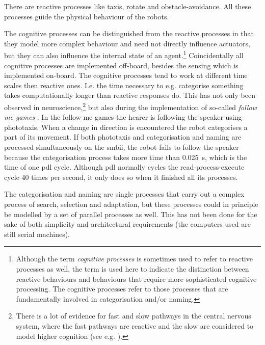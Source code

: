 There are reactive processes like taxis, rotate and obstacle-avoidance. All these processes guide the physical behaviour of the robots.


The cognitive processes can be distinguished from the reactive processes in that they model more complex behaviour and need not directly influence actuators, but they can also influence the internal state of an agent.\footnote{Although the term {\em cognitive processes} is sometimes used to refer to reactive processes as well, the term is used here to indicate the distinction between reactive behaviours and behaviours that require more sophisticated cognitive processing. The cognitive processes refer to those processes that are fundamentally involved in categorisation and/or naming.} Coincidentally all cognitive processes are implemented off-board, besides the sensing which is implemented on-board. The cognitive processes tend to work at different time scales then reactive ones. I.e. the time necessary to e.g. categorise something takes computationally longer than reactive responses do. This has not only been observed in neuroscience,\footnote{There is a lot of evidence for fast and slow pathways in the central nervous system, where the fast pathways are reactive and the slow are considered to model higher cognition (see e.g. \citealt{ledoux:1996}).} but also during the implementation of so-called {\it follow me games} \citep{vogt:1999a,vogt:2000}.  In the follow me games the hearer is following the speaker using phototaxis. When a change in direction is encountered the robot categorises a part of its movement. If both phototaxis and categorisation and naming are processed simultaneously on the {\sc smbii}, the robot fails to follow the speaker because the categorisation process takes more time than 0.025~s, which is the time of one {\sc pdl} cycle. Although {\sc pdl} normally cycles the read-process-execute cycle 40 times per second, it only does so when it finished all its processes. 

The categorisation and naming are single processes that carry out a complex process of search, selection and adaptation, but these processes could in principle be modelled by a set of parallel processes as well. This has not been done for the sake of both simplicity and architectural requirements (the computers used are still serial machines).


